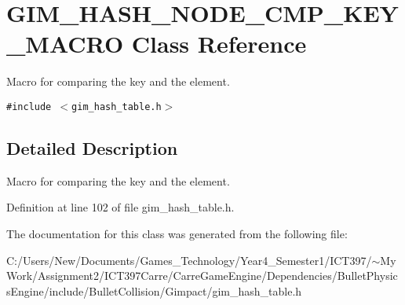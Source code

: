 \hypertarget{class_g_i_m___h_a_s_h___n_o_d_e___c_m_p___k_e_y___m_a_c_r_o}{
\section{GIM\_\-HASH\_\-NODE\_\-CMP\_\-KEY\_\-MACRO Class Reference}
\label{class_g_i_m___h_a_s_h___n_o_d_e___c_m_p___k_e_y___m_a_c_r_o}
}
Macro for comparing the key and the element.  


{\tt \#include $<$gim\_\-hash\_\-table.h$>$}



\subsection{Detailed Description}
Macro for comparing the key and the element. 

Definition at line 102 of file gim\_\-hash\_\-table.h.

The documentation for this class was generated from the following file:\begin{CompactItemize}
\item 
C:/Users/New/Documents/Games\_\-Technology/Year4\_\-Semester1/ICT397/$\sim$My Work/Assignment2/ICT397Carre/CarreGameEngine/Dependencies/BulletPhysicsEngine/include/BulletCollision/Gimpact/gim\_\-hash\_\-table.h\end{CompactItemize}
